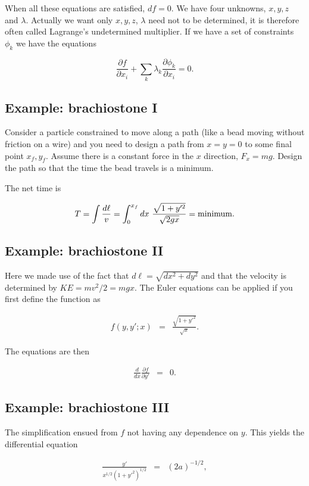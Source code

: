 \documentclass[%
oneside,                 %
final,                   %
10pt]{article}
\begin{document}
When all these equations are satisfied, $df=0$.  We have four
unknowns, $x,y,z$ and $\lambda$. Actually we want only $x,y,z$,
$\lambda$ need not to be determined, it is therefore often called
Lagrange's undetermined multiplier.  If we have a set of constraints
$\phi_k$ we have the equations

\[
\frac{\partial f}{\partial x_i}+\sum_k\lambda_k\frac{\partial \phi_k}{\partial x_i} =0.
\]

\subsection{Example: brachiostone I}

Consider a particle constrained to move along a path (like a bead
moving without friction on a wire) and you need to design a path from
$x=y=0$ to some final point $x_f,y_f$. Assume there is a constant
force in the $x$ direction, $F_x=mg$. Design the path so that the time
the bead travels is a minimum.

The net time is

\[
T=\int \frac{d\ell}{v}=\int_0^{x_f} dx~\frac{\sqrt{1+y'^2}}{\sqrt{2gx}}={\rm minimum}.
\]

\subsection{Example: brachiostone II}

Here we made use of the fact that $d\ell=\sqrt{dx^2+dy^2}$ and that
the velocity is determined by $KE=mv^2/2=mgx$. The Euler equations can
be applied if you first define the function as

\begin{eqnarray*}
f(y,y';x)&=&\frac{\sqrt{1+y'^2}}{\sqrt{x}}.
\end{eqnarray*}

The equations are then

\begin{eqnarray*}
\frac{d}{dx}\frac{\partial f}{\partial y'}&=&0.
\end{eqnarray*}

\subsection{Example: brachiostone III}

The simplification ensued from $f$ not having any dependence on $y$. This yields the differential equation

\begin{eqnarray}
\frac{y'}{x^{1/2}(1+y'^2)^{1/2}}&=&(2a)^{-1/2},
\end{eqnarray}
\end{document}
